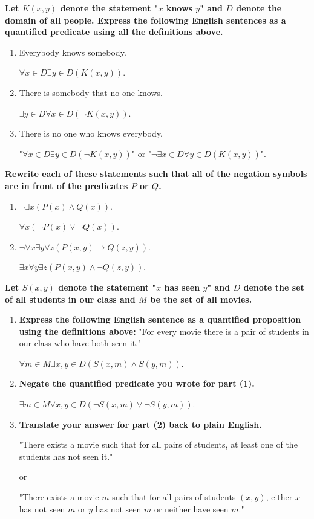 \documentclass[letterpaper, 12pt]{article}
\begin{document}
\noindent\textbf{Let $K(x,y)$ denote the statement "$x$ knows $y$" and $D$ denote the domain of all people. Express the following English sentences as a quantified predicate using all the definitions above.}
\begin{enumerate}
    \item Everybody knows somebody.
    
        $\forall x\in D \exists y\in D(K(x,y))$.
    
    \item There is somebody that no one knows.
    
        $\exists y\in D \forall x\in D(\lnot K(x,y))$.
    
    \item There is no one who knows everybody.
    
        "$\forall x\in D \exists y \in D(\lnot K(x,y))$" or "$\lnot\exists x \in D \forall y \in D(K(x,y))$".
\end{enumerate}

\noindent\textbf{Rewrite each of these statements such that all of the negation symbols are in front of the predicates $P$ or $Q$.}
\begin{enumerate}
    \item $\lnot\exists x (P(x) \land Q(x))$.
    
        $\forall x( \lnot P(x) \lor \lnot Q(x))$.
    
    \item $\lnot\forall x\exists y\forall z (P(x,y) \rightarrow Q(z,y))$.
    
        $\exists x \forall y \exists z (P(x,y) \land \lnot Q(z,y))$.
\end{enumerate}

\noindent\textbf{Let $S(x,y)$ denote the statement "$x$ has seen $y$" and $D$ denote the set of all students in our class and $M$ be the set of all movies.}
\begin{enumerate}
    \item \textbf{Express the following English sentence as a quantified proposition using the definitions above:}
    "For every movie there is a pair of students in our class who have both seen it."
    
        $\forall m \in M \exists x,y\in D(S(x,m) \land S(y,m))$.
    
    \item \textbf{Negate the quantified predicate you wrote for part (1).}
    
        $\exists m \in M \forall x,y\in D(\lnot S(x,m) \lor \lnot S(y,m))$.
    
    \item \textbf{Translate your answer for part (2) back to plain English.}
    
        "There exists a movie such that for all pairs of students, at least one of the students has not seen it." 
        
        or 
        
        "There exists a movie $m$ such that for all pairs of students $(x,y)$, either $x$ has not seen $m$ or $y$ has not seen $m$ or neither have seen $m$."
\end{enumerate}
\end{document}
